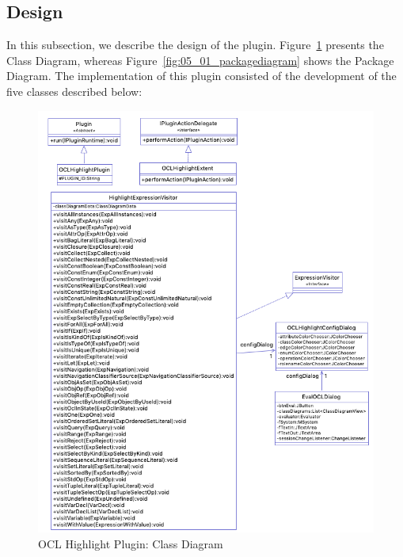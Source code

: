 \subsection{Design}

In this subsection, we describe the design of the plugin. Figure~\ref{fig:05_01_classdiagram} presents the Class Diagram, whereas Figure~\ref{fig:05_01_packagediagram} shows the Package Diagram. The implementation of this plugin consisted of the development of the five classes described below: 

\begin{figure}[ht]
    \centering
    \includegraphics[width=1\textwidth]{Chapters/figures/5_Implementation/01_ClassDiagram}
    \caption{OCL Highlight Plugin: Class Diagram}
    \label{fig:05_01_classdiagram}
\end{figure}

